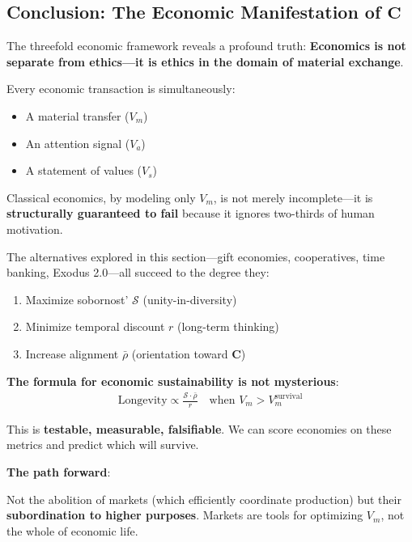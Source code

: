 \documentclass[11pt,a4paper]{article}
\theoremstyle{definition}
\theoremstyle{remark}
\begin{document}
\begin{small}
\begin{enumerate}
\vspace{2em}

\subsection{Conclusion: The Economic Manifestation of \(\mathbf{C}\)}

The threefold economic framework reveals a profound truth: \textbf{Economics is not separate from ethics—it is ethics in the domain of material exchange}.

Every economic transaction is simultaneously:
\begin{itemize}
    \item A material transfer (\(V_m\))
    \item An attention signal (\(V_a\))
    \item A statement of values (\(V_s\))
\end{itemize}

Classical economics, by modeling only \(V_m\), is not merely incomplete—it is \textbf{structurally guaranteed to fail} because it ignores two-thirds of human motivation.

The alternatives explored in this section—gift economies, cooperatives, time banking, Exodus 2.0—all succeed to the degree they:
\begin{enumerate}
    \item Maximize sobornost' \(\mathcal{S}\) (unity-in-diversity)
    \item Minimize temporal discount \(r\) (long-term thinking)
    \item Increase alignment \(\bar{\rho}\) (orientation toward \(\mathbf{C}\))
\end{enumerate}

\textbf{The formula for economic sustainability is not mysterious}:
\begin{align}
\text{Longevity} \propto \frac{\mathcal{S} \cdot \bar{\rho}}{r} \quad \text{when } V_m > V_m^{\text{survival}}
\end{align}

This is \textbf{testable, measurable, falsifiable}. We can score economies on these metrics and predict which will survive.

\textbf{The path forward}:

Not the abolition of markets (which efficiently coordinate production) but their \textbf{subordination to higher purposes}. Markets are tools for optimizing \(V_m\), not the whole of economic life.


\end{enumerate}
\end{small}
\end{document}
